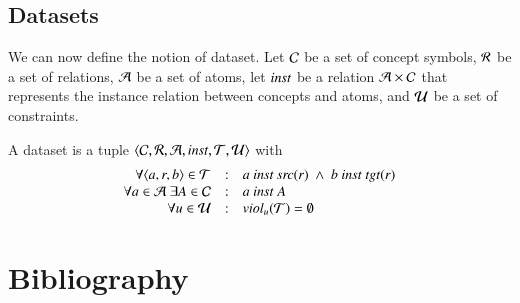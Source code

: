 \documentclass{elsarticle}
\begin{document}
\subsection{Datasets}
	We can now define the notion of dataset.
	Let	$\mathcal{C}$ be a set of concept symbols,
	$\mathcal{R}$ be a set of relations,
	$\mathcal{A}$ be a set of atoms,
	let $\text{\it inst\/}$ be a relation $\mathcal{A}\times\mathcal{C}$ that represents the instance relation between concepts and atoms,
	and $\mathcal{U}$ be a set of constraints.
\begin{definition}[dataset]
	\label{def:dataset}
	\item A dataset is a tuple $\langle\mathcal{C},\mathcal{R},\mathcal{A},\text{\it inst\/},\mathcal{T},\mathcal{U}\rangle$ with
	\[\begin{array}[3]{rcl}
		\forall\triple{a}{r}{b}\in\triples&:&a\ \inst\ \src{r}\ \wedge\ b\ \inst\ \tgt{r}\\
		\forall a\in\atoms\ \exists A\in\concepts&:&a\ \inst\ A\\
		\forall u\in\rules&:&\viol{\triples}{u}=\emptyset
	\end{array}\]
\end{definition}


\section{Bibliography}


\end{document}
